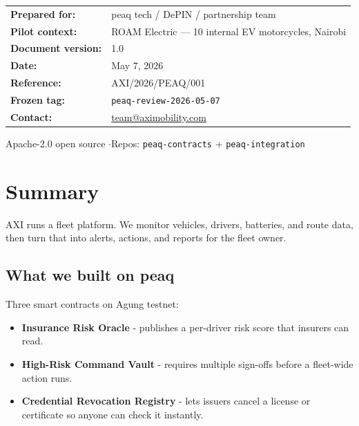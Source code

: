 \documentclass[11pt,a4paper]{article}
\begin{document}
\begin{center}
\begin{tabular}{p{4.5cm} p{9.5cm}}
\textbf{\color{axidark}Prepared for:} & peaq tech / DePIN / partnership team \\
\textbf{\color{axidark}Pilot context:} & ROAM Electric --- 10 internal EV motorcycles, Nairobi \\
\textbf{\color{axidark}Document version:} & 1.0 \\
\textbf{\color{axidark}Date:} & May 7, 2026 \\
\textbf{\color{axidark}Reference:} & AXI/2026/PEAQ/001 \\
\textbf{\color{axidark}Frozen tag:} & \texttt{peaq-review-2026-05-07} \\
\textbf{\color{axidark}Contact:} & \href{mailto:team@aximobility.com}{team@aximobility.com} \\
\end{tabular}
\end{center}

\vspace{0.6cm}

\begin{center}
{\small\color{axigray} Apache-2.0 open source \enspace$\cdot$\enspace Repos: \texttt{peaq-contracts} + \texttt{peaq-integration}}
\end{center}

\newpage

\section{Summary}

AXI runs a fleet platform. We monitor vehicles, drivers, batteries, and route data, then turn that into alerts, actions, and reports for the fleet owner.

\subsection{What we built on peaq}

Three smart contracts on Agung testnet:

\begin{itemize}[leftmargin=*, nosep]
  \item \textbf{Insurance Risk Oracle} - publishes a per-driver risk score that insurers can read.
  \item \textbf{High-Risk Command Vault} - requires multiple sign-offs before a fleet-wide action runs.
  \item \textbf{Credential Revocation Registry} - lets issuers cancel a license or certificate so anyone can check it instantly.
\end{itemize}
\end{document}
